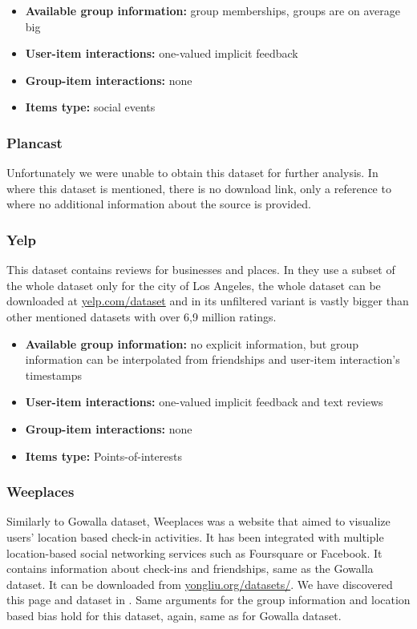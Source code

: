 \begin{itemize}
    \item \textbf{Available group information:} group memberships, groups are on average big
    \item \textbf{User-item interactions:} one-valued implicit feedback
    \item \textbf{Group-item interactions:} none
    \item \textbf{Items type:} social events
\end{itemize}


\subsubsection{Plancast} \label{subsubsec:04_group_datasets.overview.plancast}
Unfortunately we were unable to obtain this dataset for further analysis. In \cite{meetup_plancast} where this dataset is mentioned, there is no download link, only a reference to \cite{plancast_origin} where no additional information about the source is provided.

\subsubsection{Yelp}\label{subsubsec:04_group_datasets.overview.yelp}
This dataset contains reviews for businesses and places. In \cite{gowalla_weeplaces_yelp} they use a subset of the whole dataset only for the city of Los Angeles, the whole dataset can be downloaded at \href{https://www.yelp.com/dataset}{yelp.com/dataset} and in its unfiltered variant is vastly bigger than other mentioned datasets with over 6,9 million ratings.

\begin{itemize}
    \item \textbf{Available group information:} no explicit information, but group information can be interpolated from friendships and user-item interaction's timestamps
    \item \textbf{User-item interactions:} one-valued implicit feedback and text reviews
    \item \textbf{Group-item interactions:} none
    \item \textbf{Items type:} Points-of-interests
\end{itemize}


\subsubsection{Weeplaces} \label{subsubsec:04_group_datasets.overview.weeplaces}
Similarly to Gowalla dataset, Weeplaces was a website that aimed to visualize users' location based check-in activities. It has been integrated with multiple location-based social networking services such as Foursquare or Facebook.
It contains information about check-ins and friendships, same as the Gowalla dataset. It can be downloaded from \href{https://www.yongliu.org/datasets/}{yongliu.org/datasets/}. We have discovered this page and dataset in \cite{gowalla_weeplaces_yelp}.
Same arguments for the group information and location based bias hold for this dataset, again, same as for Gowalla dataset. 

